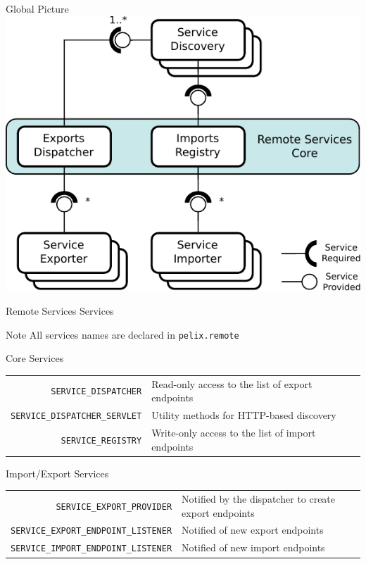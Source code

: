 \begin{frame}{Global Picture}
\centering
\includegraphics[height=.8\textheight]{../imgs/rs_arch}
\end{frame}

\begin{frame}{Remote Services Services}
\begin{exampleblock}{Note}
All services names are declared in \texttt{pelix.remote}
\end{exampleblock}

\begin{block}{Core Services}
\begin{small}
\begin{tabular}{rp{}}
\texttt{\scriptsize SERVICE\_DISPATCHER} & Read-only access to the list of export endpoints \\
\texttt{\scriptsize SERVICE\_DISPATCHER\_SERVLET} & Utility methods for HTTP-based discovery \\
\texttt{\scriptsize SERVICE\_REGISTRY} & Write-only access to the list of import endpoints \\
\end{tabular}
\end{small}
\end{block}

\begin{block}{Import/Export Services}
\begin{small}
\begin{tabular}{rp{}}
\texttt{\scriptsize SERVICE\_EXPORT\_PROVIDER} & Notified by the dispatcher to create export endpoints \\
\texttt{\scriptsize SERVICE\_EXPORT\_ENDPOINT\_LISTENER} & Notified of new export endpoints \\
\texttt{\scriptsize SERVICE\_IMPORT\_ENDPOINT\_LISTENER} & Notified of new import endpoints \\
\end{tabular}
\end{small}
\end{block}
\end{frame}

